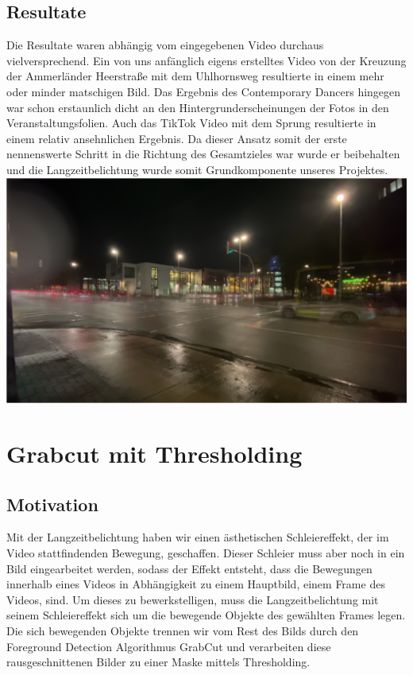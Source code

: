 \documentclass[12pt]{scrartcl}
\begin{document}
 \subsection{Resultate}Die Resultate waren abh\"angig vom eingegebenen Video durchaus vielversprechend. Ein von uns anf\"anglich eigens erstelltes Video von der Kreuzung der Ammerl\"ander Heerstra{\ss}e mit dem Uhlhornsweg resultierte in einem mehr oder minder matschigen Bild. Das Ergebnis des Contemporary Dancers hingegen war schon erstaunlich dicht an den Hintergrunderscheinungen der Fotos in den Veranstaltungsfolien. Auch das TikTok Video mit dem Sprung resultierte in einem relativ ansehnlichen Ergebnis. Da dieser Ansatz somit der erste nennenswerte Schritt in die Richtung des Gesamtzieles war wurde er beibehalten und die Langzeitbelichtung wurde somit Grundkomponente unseres Projektes.\\
 \includegraphics[width=\textwidth]{media/artlzb}


\section{Grabcut mit Thresholding}
\subsection{Motivation}
Mit der Langzeitbelichtung haben wir einen \"asthetischen Schleiereffekt, der im Video stattfindenden Bewegung, geschaffen. Dieser Schleier muss aber noch in ein Bild eingearbeitet werden, sodass der Effekt entsteht, dass die Bewegungen innerhalb eines Videos in Abh\"angigkeit zu einem Hauptbild, einem Frame des Videos, sind. Um dieses zu bewerkstelligen, muss die Langzeitbelichtung mit seinem Schleiereffekt sich um die bewegende Objekte des gew\"ahlten Frames legen. Die sich bewegenden Objekte trennen wir vom Rest des Bilds durch den Foreground Detection Algorithmus GrabCut und verarbeiten diese rausgeschnittenen Bilder zu einer Maske mittels Thresholding.
\end{document}
